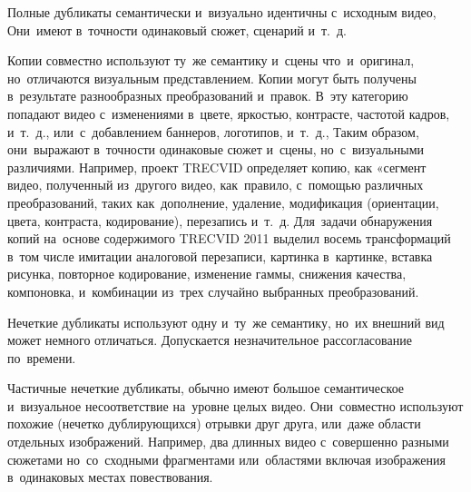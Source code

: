 Полные дубликаты семантически и~визуально идентичны с~исходным видео,
Они~имеют в~точности одинаковый сюжет, сценарий  и~т.~д.

Копии совместно используют ту~же семантику и~сцены что~и~оригинал,
но~отличаются визуальным представлением.
Копии могут быть получены в~результате разнообразных преобразований и~правок.
В~эту категорию попадают видео с~изменениями в~цвете,
яркостью, контрасте, частотой кадров, и~т.~д.,
или~с~добавлением баннеров, логотипов, и~т.~д.,
Таким образом, они~выражают в~точности одинаковые сюжет и~сцены,
но~с~визуальными различиями.
Например, проект TRECVID \cite{Over:2011} определяет копию, как
«сегмент видео, полученный из~другого видео,
как~правило, с~помощью различных преобразований,
таких как~дополнение, удаление, модификация
(ориентации, цвета, контраста, кодирование),
перезапись и~т.~д.
Для~задачи обнаружения копий на~основе 
содержимого TRECVID 2011 выделил восемь
трансформаций в~том числе
имитации аналоговой перезаписи,
картинка в~картинке,
вставка рисунка,
повторное кодирование,
изменение гаммы,
снижения качества,
компоновка,
и~комбинации из~трех случайно выбранных преобразований.

Нечеткие дубликаты используют одну и~ту~же семантику,
но~их внешний вид может немного отличаться.
Допускается незначительное рассогласование по~времени.

Частичные нечеткие дубликаты, обычно имеют большое семантическое
и~визуальное несоответствие на~уровне целых видео.
Они~совместно используют похожие (нечетко дублирующихся) отрывки друг друга,
или~даже области отдельных изображений.
Например, два длинных видео с~совершенно разными сюжетами
но~со~сходными фрагментами или~областями включая
изображения в~одинаковых местах повествования.
